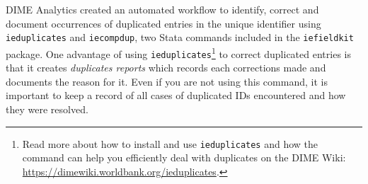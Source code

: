 \documentclass[
]{book}
\begin{document}
DIME Analytics created an automated workflow to identify, correct and document
occurrences of duplicated entries in the unique identifier using
\texttt{ieduplicates} and \texttt{iecompdup},
two Stata commands included in the \texttt{iefieldkit} package.
One advantage of using \texttt{ieduplicates}\footnote{Read more about how to install and use \texttt{ieduplicates} and
  how the command can help you efficiently deal with duplicates
  on the DIME Wiki:
  \url{https://dimewiki.worldbank.org/ieduplicates}.}
to correct duplicated entries is that it creates \emph{duplicates reports}
which records each corrections made and documents the reason for it.
Even if you are not using this command,
it is important to keep a record of all cases of duplicated IDs encountered
and how they were resolved.
\end{document}

